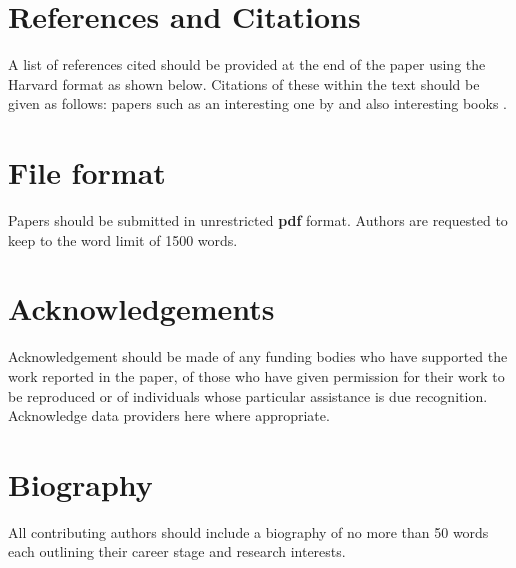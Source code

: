 \documentclass[11pt]{article}
\begin{document}
\section{References and Citations}

A list of references cited should be provided at the end of the paper using the Harvard format as shown below. Citations of these within the text should be given as follows: papers such as an interesting one by \citet{HARVEY:2006} and also interesting books \citep{DAY:2006}.

\section{File format}

Papers should be submitted in unrestricted \textbf{pdf} format. Authors are requested to keep to the word limit of 1500 words. 

\section{Acknowledgements}

Acknowledgement should be made of any funding bodies who have supported the work reported in the paper, of those who have given permission for their work to be reproduced or of individuals whose particular assistance is due recognition. Acknowledge data providers here where appropriate.

\section{Biography}
All contributing authors should include a biography of no more than 50 words each outlining their career stage and research interests.



% 
% 
\end{document}
